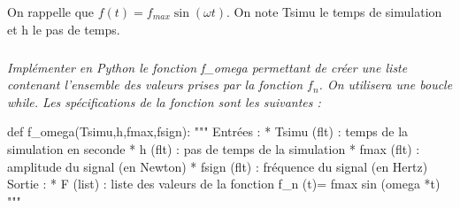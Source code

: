 \documentclass[10pt]{article}
\newif\ifprof
\begin{document}
\ifprof
\begin{corrige}

D'après la question 2 on a :
$$v_n = \dfrac{x_{n}-x_{n-1}}{h} \quad \text{et} \quad v_{n-1} = \dfrac{x_{n-1}-x_{n-2}}{h}$$ 

En utilisant le résultat de la question 3, on a :
$$
m\dfrac{x_{n}-x_{n-1}}{h}  = hf_n -  (kh+c) \cdot x_n + m\dfrac{x_{n-1}-x_{n-2}}{h}+cx_{n-1}
$$

$$
\Longleftrightarrow 
m(x_{n}-x_{n-1}) = h^2f_n -  h(kh+c) \cdot x_n + m(x_{n-1}-x_{n-2})+chx_{n-1}
$$

$$
\Longleftrightarrow 
m(x_{n}-x_{n-1}) +  h(kh+c) \cdot x_n - m(x_{n-1}-x_{n-2})-chx_{n-1} = h^2f_n 
$$


$$
\Longleftrightarrow 
x_{n}\left(m +kh^2+ch\right)-x_{n-1}(2m+ch) +mx_{n-2} = h^2f_n 
$$

$$
\Longleftrightarrow 
x_{n}= \dfrac{1}{m +kh^2+ch} \left(h^2f_n +x_{n-1}(2m+ch) -mx_{n-2} \right)
$$

\end{corrige}
\else
\fi

\ifprof
\else

\vspace{.5cm}

On rappelle que $f(t)=f_{max} \sin \left(\omega t\right)$. On note \textsf{Tsimu} le temps de simulation et \textsf{h} le pas de temps. 

\fi
\subparagraph{}
\textit{Implémenter en Python le fonction \textsf{f\_omega} permettant de créer une liste contenant l'ensemble des valeurs prises par la fonction $f_n$. On utilisera une boucle \textsf{while}. Les spécifications de la fonction sont les suivantes : }
\ifprof
\else


\begin{py}
\begin{python}
def f_omega(Tsimu,h,fmax,fsign):
   """
   Entrées :
       * Tsimu (flt) : temps de la simulation en seconde
       * h (flt) : pas de temps de la simulation
       * fmax (flt) : amplitude du signal (en Newton)
       * fsign (flt) : fréquence du signal (en Hertz)
   Sortie : 
       * F (list) : liste des valeurs de la fonction 
          f_n (t)= fmax sin (omega *t)
   """
\end{python}
\end{py}

\fi
\end{document}
